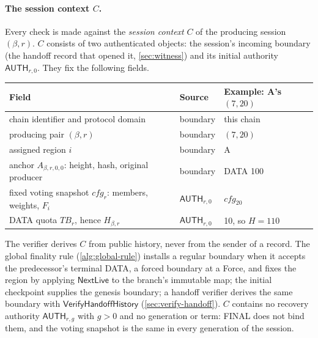 \documentclass[11pt,a4paper]{article}
\newcommand{\TB}{\mathit{TB}}
\newcommand{\tagg}[1]{\ensuremath{\mathsf{#1}}}
\newcommand{\defterm}[1]{\textcolor{rrBlue}{\textit{#1}}}
\newcounter{protocol}
\begin{document}
\paragraph{The session context $C$.}
Every check is made against the \defterm{session context} $C$ of the
producing session $(\beta,r)$. $C$ consists of two authenticated
objects: the session's incoming boundary (the handoff record that opened
it, \cref{sec:witness}) and its initial authority $\tagg{AUTH}_{r,0}$.
They fix the following fields.
\begin{center}\small
\begin{tabularx}{\linewidth}{@{}>{\raggedright\arraybackslash}p{.36\linewidth}>{\raggedright\arraybackslash}p{.2\linewidth}Y@{}}\toprule
Field & Source & Example: A's $(7,20)$\\\midrule
chain identifier and protocol domain & boundary & this chain\\
producing pair $(\beta,r)$ & boundary & $(7,20)$\\
assigned region $i$ & boundary & A\\
anchor $A_{\beta,r,0,0}$: height, hash, original producer & boundary & DATA 100\\
fixed voting snapshot $\mathit{cfg}_r$: members, weights, $F_i$ & $\tagg{AUTH}_{r,0}$ & $\mathit{cfg}_{20}$\\
DATA quota $\TB_r$, hence $H_{\beta,r}$ & $\tagg{AUTH}_{r,0}$ & 10, so $H=110$\\\bottomrule
\end{tabularx}
\end{center}
The verifier derives $C$ from public history, never from the sender of a
record. The global finality rule (\cref{alg:global-rule}) installs a
regular boundary when it accepts the predecessor's terminal DATA, a
forced boundary at a Force, and fixes the region by applying
$\tagg{NextLive}$ to the branch's immutable map; the
initial checkpoint supplies the genesis boundary; a handoff verifier
derives the same boundary with $\tagg{VerifyHandoffHistory}$
(\cref{sec:verify-handoff}). $C$ contains no recovery authority
$\tagg{AUTH}_{r,g}$ with $g>0$ and no generation or term: FINAL does not
bind them, and the voting snapshot is the same in every generation of
the session.
\end{document}
